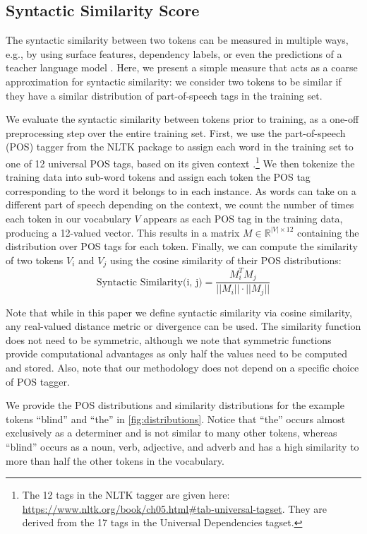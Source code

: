 \subsection{Syntactic Similarity Score}\label{sec:sim}

The syntactic similarity between two tokens can be measured in multiple ways, e.g., by using surface features, dependency labels, or even the predictions of a teacher language model \citep{hinton2015distilling}. Here, we present a simple measure that acts as a coarse approximation for syntactic similarity: we consider two tokens to be similar if they have a similar distribution of part-of-speech tags in the training set.

We evaluate the syntactic similarity between tokens prior to training, as a one-off preprocessing step over the entire training set. First, we use the part-of-speech (POS) tagger from the NLTK package \citep{bird2009natural} to assign each word in the training set to one of 12 universal POS tags, based on its given context \citep{petrov2012universalpos}.\footnote{The 12 tags in the NLTK tagger are given here: \url{https://www.nltk.org/book/ch05.html\#tab-universal-tagset}. They are derived from the 17 tags in the Universal Dependencies tagset.} We then tokenize the training data into sub-word tokens and assign each token the POS tag corresponding to the word it belongs to in each instance. As words can take on a different part of speech depending on the context, we count the number of times each token in our vocabulary $V$ appears as each POS tag in the training data, producing a 12-valued vector. This results in a matrix $M \in \mathbb{R}^{|V|\times 12}$ containing the distribution over POS tags for each token. Finally, we can compute the similarity of two tokens $V_i$ and $V_j$ using the cosine similarity of their POS distributions: $$ \text{Syntactic Similarity(i, j)} = \frac{M_i^TM_j}{||M_i|| \cdot ||M_j||}$$ 


Note that while in this paper we define syntactic similarity via cosine similarity, any real-valued distance metric or divergence can be used. The similarity function does not need to be symmetric, although we note that symmetric functions provide computational advantages as only half the values need to be computed and stored. Also, note that our methodology does not depend on a specific choice of POS tagger.

We provide the POS distributions and similarity distributions for the example tokens ``blind'' and ``the'' in \cref{fig:distributions}. Notice that ``the'' occurs almost exclusively as a determiner and is not similar to many other tokens, whereas ``blind'' occurs as a noun, verb, adjective, and adverb and has a high similarity to more than half the other tokens in the vocabulary.

